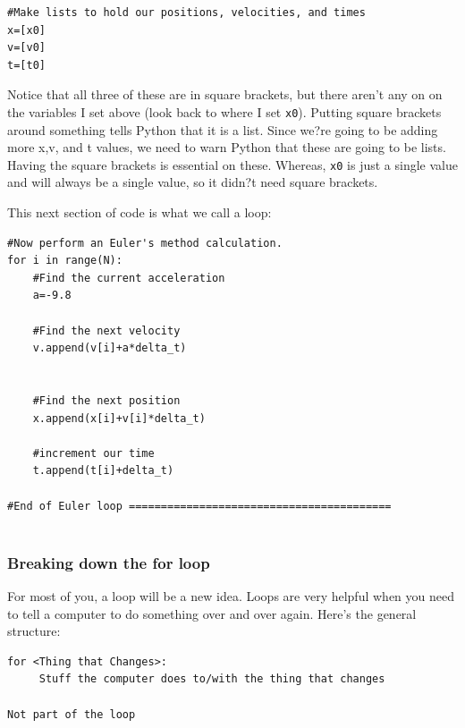 \documentclass[twoside,11pt,ShortChapTitles]{BYUTextbook}
\begin{document}
\begin{lstlisting}
#Make lists to hold our positions, velocities, and times
x=[x0]
v=[v0]
t=[t0]

\end{lstlisting}
Notice that all three of these are in square brackets, but there aren't any on on the variables I set above (look back to where I set \lstinline[columns=fixed]!x0!).  
Putting square brackets around something tells Python that it is a list.  Since we?re going to be adding more x,v, and t values, we need to warn Python that these are going to be lists.
Having the square brackets is essential on these. Whereas, \lstinline[columns=fixed]!x0! is just a single value and will always be a single value, so it didn?t need square brackets.

This next section of code is what we call a loop:
\begin{lstlisting}
#Now perform an Euler's method calculation.
for i in range(N):
    #Find the current acceleration
    a=-9.8
    
    #Find the next velocity
    v.append(v[i]+a*delta_t)    
    
    
    #Find the next position
    x.append(x[i]+v[i]*delta_t)
    
    #increment our time
    t.append(t[i]+delta_t)

#End of Euler loop =========================================


\end{lstlisting}

\subsubsection{Breaking down the for loop}
For most of you, a loop will be a new idea. Loops are very helpful when you need to tell a computer to do something over and over again.  Here's the general structure:
\begin{lstlisting}
for <Thing that Changes>:
     Stuff the computer does to/with the thing that changes

Not part of the loop
\end{lstlisting}
\end{document}

